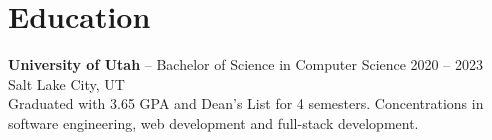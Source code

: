 \documentclass[11pt]{article}       %
\begin{document}
\vspace{-18.5pt}

\section*{Education}
\textbf{University of Utah} -- Bachelor of Science in Computer Science \hfill 2020 -- 2023 \\
Salt Lake City, UT \\
Graduated with 3.65 GPA and Dean's List for 4 semesters. Concentrations in software engineering, web development and full-stack development.



\end{document}
